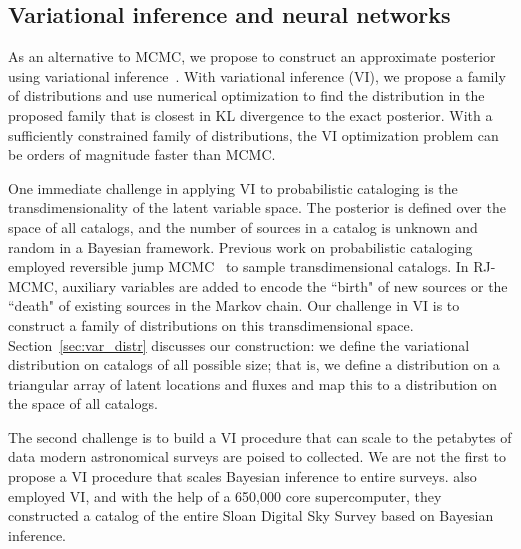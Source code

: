 \subsection{Variational inference and neural networks}
As an alternative to MCMC, we propose to construct an approximate posterior using variational inference~\cite{Blei_2017_vi_review,Jordan_intro_vi, Wainwrite_graph_models_vi}.
With variational inference (VI), we propose a family of distributions and use numerical optimization to find the distribution 
in the proposed family that is closest 
in KL divergence to the exact posterior. 
With a sufficiently constrained family of distributions, the VI optimization problem can be orders of magnitude faster than MCMC. 



One immediate challenge in applying VI to probabilistic cataloging is the transdimensionality 
of the latent variable space. The posterior 
is defined over the space of all catalogs, and the number of sources in a catalog is unknown and random in a Bayesian framework.
Previous work on probabilistic cataloging employed reversible jump MCMC~\cite{Green95reversiblejump} to sample transdimensional catalogs. In RJ-MCMC, auxiliary variables are added to encode the ``birth" of new sources 
or the ``death" of existing sources in the Markov chain. Our challenge in VI is to construct a family of distributions on this transdimensional space. Section~\ref{sec:var_distr} discusses our construction: we define the variational distribution on catalogs of all possible size; that is, we define a distribution on a triangular array of latent locations and fluxes and map this to a distribution 
on the space of all catalogs.

The second challenge is to build a VI procedure 
that can scale to the petabytes of data 
modern astronomical surveys are poised to collected.
We are not the first to propose a VI procedure
that scales Bayesian inference to entire surveys. 
\cite{regier2019_celeste} also employed 
VI, and with the help of a 650,000 core supercomputer, they constructed a catalog of the entire Sloan Digital Sky Survey based on Bayesian inference. 

